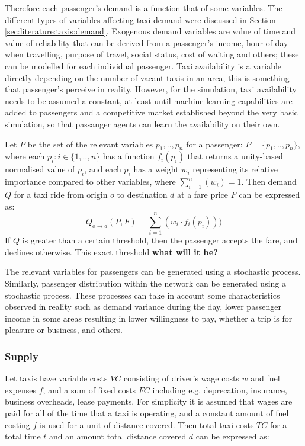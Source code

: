 Therefore each passenger's demand is a function that of some variables. The
different types of variables affecting taxi demand were discussed in Section
\ref{sec:literature:taxis:demand}. Exogenous demand variables are value of time
and value of reliability that can be derived from a passenger's income, hour of
day when travelling, purpose of travel, social status, cost of waiting and
others; these can be modelled for each individual passenger. Taxi availability
is a variable directly depending on the number of vacant taxis in an area, this
is something that passenger's perceive in reality. However, for the simulation,
taxi availability needs to be assumed a constant, at least until machine
learning capabilities are added to passengers and a competitive market
established beyond the very basic simulation, so that passanger agents can
learn the availability on their own.

Let \(P\) be the set of the relevant variables \(p_1,..,p_n\) for
a  passenger: \(P = \{p_1,..,p_n\}\), \newline
where each \(p_i : i \in \{1, .., n\}\) has a function \(f_i (p_i) \) that
returns a unity-based  normalised value of \(p_i\), \newline 
and each \(p_i\) has a weight \(w_i\) representing its relative importance  
compared to other variables, where \(\sum_{i=1}^n (w_i) = 1 \). \newline 
Then demand \(Q\) for a taxi ride from origin \(o\) to destination \(d\) at a  
fare price \(F\) can be expressed as: 
\[ Q _{o \rightarrow d} (P,F) = \sum_{i=1}^{n} (w_i \cdot f_i (p_i) )) \]
If \(Q\) is greater than a certain threshold, then the passenger accepts the 
fare, and declines otherwise. This exact threshold \textbf{what will it be?}

The relevant variables for passengers can be generated using a stochastic
process. Similarly, passenger distribution within the network can be generated
using a stochastic process. These processes can take in account some
characteristics observed in reality such as demand variance during the day,
lower passenger income in some areas resulting in lower willingness to pay,
whether a trip is for pleasure or business, and others.

\subsubsection{Supply} 

Let taxis have variable costs \(VC\) consisting of driver's wage costs \(w\)
and fuel expenses \(f\), and a sum of fixed costs \(FC\) including e.g.
deprecation, insurance, business overheads, lease payments. For simplicity it
is assumed that wages are paid for all of the time that a taxi is operating,
and a constant amount of fuel costing \(f\) is used for a unit of distance
covered. Then total taxi costs \(TC\) for a total time \(t\) and an amount
total distance covered \(d\) can be expressed as:

